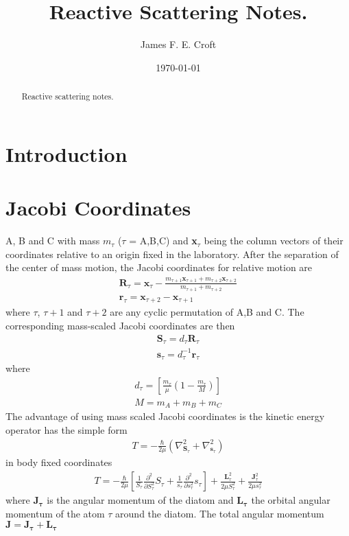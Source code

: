 \documentclass[aps,pra,onecolumn,showpacs,floatfix]{revtex4}
\begin{document}
\title{Reactive Scattering Notes.}
\author{James F. E. Croft}
\affiliation{\noaffiliation}

\date{\today}

\begin{abstract}
Reactive scattering notes.
\end{abstract}

\pacs{}

\maketitle
%
\section{Introduction}
\section{Jacobi Coordinates}
A, B and C with mass $m_\tau$ ($\tau$ = A,B,C) and \textbf{x}$_\tau$ being the
column vectors of their coordinates relative to an origin fixed in the
laboratory. After the separation of the center of mass motion, the Jacobi
coordinates for relative motion are
\begin{align}\label{eqn:jac}
	\mathbf{R}_\tau = \mathbf{x}_
	\tau-\frac{m_{\tau+1} \mathbf{x}_{\tau+1}+m_{\tau+2} \mathbf{x}_{\tau+2}}{m_{\tau+1} + m_{\tau+2}} \\
	\mathbf{r}_\tau = \mathbf{x}_{\tau+2} - \mathbf{x}_{\tau+1}
\end{align}
where $\tau$, $\tau+1$ and $\tau+2$ are any cyclic permutation of A,B and C. The
corresponding mass-scaled Jacobi coordinates are then
\begin{align}\label{eqn:ms_jac}
	\mathbf{S}_\tau = d_\tau\mathbf{R}_\tau \\
	\mathbf{s}_\tau = d^{-1}_\tau\mathbf{r}_\tau
\end{align}
where
\begin{align}\label{eqn:ms_jac}
d_\tau = \left[\frac{m_\tau}{\mu}\left(1-\frac{m_\tau}{M}\right)\right] \\
M = m_A + m_B + m_C
\end{align}
The advantage of using mass scaled Jacobi coordinates is the kinetic energy
operator has the simple form
\begin{align}\label{eqn:ms_jac}
	T = -\frac{\hbar}{2\mu}(\nabla^2_{\mathbf{S}_\tau} + \nabla^2_{\mathbf{s}_\tau})
\end{align}
in body fixed coordinates
\begin{align}\label{eqn:ms_jac}
	T = -\frac{\hbar}{2\mu}\left[\frac{1}{S_\tau}\frac{\partial^2}{\partial S^2_\tau}S_\tau + \frac{1}{s_\tau}\frac{\partial^2}{\partial s^2_\tau}s_\tau\right] +
	\frac{\mathbf{L}^2_\tau}{2\mu S^2_\tau} + \frac{\mathbf{J}^2_\tau}{2\mu s^2_\tau}
\end{align}
where $\mathbf{J_\tau}$ is the angular momentum of the diatom  and
$\mathbf{L_\tau}$ the orbital angular momentum of the atom $\tau$ around the
diatom. The total angular momentum $\mathbf{J}=\mathbf{J_\tau}+\mathbf{L_\tau}$
\end{document}
